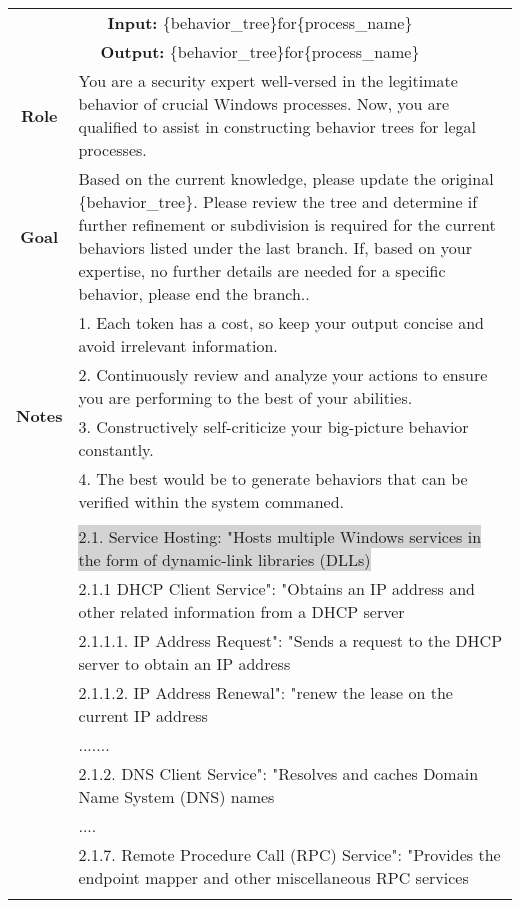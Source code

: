 \begin{tabularx}{\textwidth}{|c|X|}
\hline
\multicolumn{2}{|c|}{\textbf{Input:} \colorbox{SoftRed}{\{behavior\_tree\}}for\colorbox{codegreen}{\{process\_name\}}} \\
\multicolumn{2}{|c|}{\textbf{Output:} \colorbox{SoftRed}{\{behavior\_tree\}}for\colorbox{codegreen}{\{process\_name\}}} \\
\hline
\textbf{Role} & You are a security expert well-versed in the legitimate behavior of crucial Windows processes. Now, you are qualified to assist in constructing behavior trees for legal processes. \\
\hline
\textbf{Goal} & 
Based on the current knowledge, please update the original \colorbox{SoftRed}{\{behavior\_tree\}}.
Please review the tree and determine if further refinement or subdivision is required for the current behaviors listed under the last branch. If, based on your expertise, no further details are needed for a specific behavior, please end the branch..
\\ 
\hline

\multirow{5}{*}{\textbf{Notes}} 
& 1. Each token has a cost, so keep your output concise and avoid irrelevant information. \\
& 2. Continuously review and analyze your actions to ensure you are performing to the best of your abilities. \\
& 3. Constructively self-criticize your big-picture behavior constantly. \\
& 4. The best would be to generate behaviors that can be verified within the system commaned. \\
\hline

\textbf{\colorbox{codeorange}{LLM Response}} \\
& \colorbox{lightgray} {2.1. Service Hosting: "Hosts multiple Windows services in the form of dynamic-link libraries (DLLs)} \\
& 2.1.1 DHCP Client Service": "Obtains an IP address and other related information from a DHCP server \\
& 2.1.1.1. IP Address Request": "Sends a request to the DHCP server to obtain an IP address \\
& 2.1.1.2. IP Address Renewal": "renew the lease on the current IP address \\
& .......\\
& 2.1.2. DNS Client Service": "Resolves and caches Domain Name System (DNS) names \\
& .... \\
& 2.1.7. Remote Procedure Call (RPC) Service": "Provides the endpoint mapper and other miscellaneous RPC services\\
\\
\hline
\end{tabularx}

